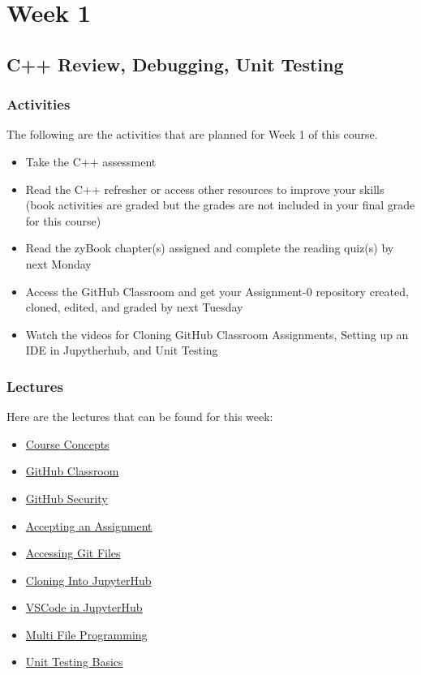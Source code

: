 \clearpage
\chapter{Week 1}

\section{C++ Review, Debugging, Unit Testing}
\horizontalline

\subsection{Activities}
The following are the activities that are planned for Week 1 of this course.
\begin{itemize}
    \item Take the C++ assessment
    \item Read the C++ refresher or access other resources to improve your skills
    (book activities are graded but the grades are not included in your final grade for this course)
    \item Read the zyBook chapter(s) assigned and complete the reading quiz(s) by next Monday
    \item Access the GitHub Classroom and get your Assignment-0 repository created, cloned, edited, and graded by next Tuesday
    \item Watch the videos for Cloning GitHub Classroom Assignments, Setting up an IDE in Jupytherhub, and Unit Testing
\end{itemize}

\subsection{Lectures}

Here are the lectures that can be found for this week:
\begin{itemize}
    \item \href{https://www.youtube.com/watch?v=l3e6UsF1RdQ}{Course Concepts}
    \item \href{https://www.youtube.com/watch?v=hu81oFq0nA8}{GitHub Classroom}
    \item \href{https://www.youtube.com/watch?v=7_x86HeoglQ&t=178s}{GitHub Security}
    \item \href{https://www.youtube.com/watch?v=b0Ystl84XYY}{Accepting an Assignment}
    \item \href{https://applied.cs.colorado.edu/mod/page/view.php?id=45856}{Accessing Git Files}
    \item \href{https://www.youtube.com/watch?v=M293X5ssks4}{Cloning Into JupyterHub}
    \item \href{https://www.youtube.com/watch?v=dptdfci_Zn0}{VSCode in JupyterHub}
    \item \href{https://www.youtube.com/watch?v=jchWSvAdadE}{Multi File Programming}
    \item \href{https://www.youtube.com/watch?v=tsVh8mG2tM0}{Unit Testing Basics}
\end{itemize}

